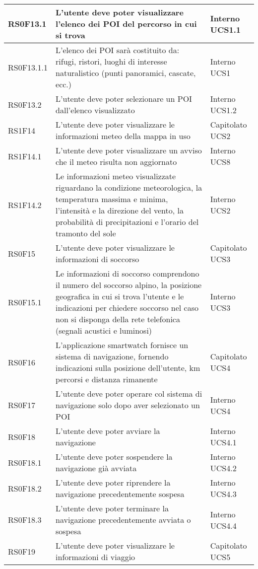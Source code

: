 \begin{center}
\begin{longtable}{|l|p{7cm}|p{1.7cm}|}
RS0F13.1	& L'utente deve poter visualizzare l'elenco dei POI del percorso in cui si trova & Interno UCS1.1 \\\hline
RS0F13.1.1	& L'elenco dei POI sarà costituito da: rifugi, ristori, luoghi di interesse naturalistico (punti panoramici, cascate, ecc.) & Interno UCS1 \\\hline
RS0F13.2	& L'utente deve poter selezionare un POI dall'elenco visualizzato & Interno UCS1.2 \\\hline
RS1F14		& L'utente deve poter visualizzare le informazioni meteo della mappa in uso & Capitolato UCS2 \\\hline
RS1F14.1	& L'utente deve poter visualizzare un avviso che il meteo risulta non aggiornato & Interno UCS8 \\\hline
RS1F14.2	& Le informazioni meteo visualizzate riguardano la condizione meteorologica, la temperatura massima e minima, l'intensità e la direzione del vento, la probabilità di precipitazioni e l'orario del tramonto del sole & Interno UCS2 \\\hline
RS0F15		& L'utente deve poter visualizzare le informazioni di soccorso & Capitolato UCS3 \\\hline
RS0F15.1	& Le informazioni di soccorso comprendono il numero del soccorso alpino, la posizione geografica in cui si trova l'utente e le indicazioni per chiedere soccorso nel caso non si disponga della rete telefonica (segnali acustici e luminosi) & Interno UCS3 \\\hline
RS0F16		& L'applicazione smartwatch fornisce un sistema di navigazione, fornendo indicazioni sulla posizione dell’utente, km percorsi e distanza rimanente & Capitolato UCS4 \\\hline
RS0F17		& L'utente deve poter operare col sistema di navigazione solo dopo aver selezionato un POI & Interno UCS4 \\\hline
RS0F18		& L'utente deve poter avviare la navigazione & Interno UCS4.1 \\\hline
RS0F18.1	& L'utente deve poter sospendere la navigazione già avviata & Interno UCS4.2 \\\hline
RS0F18.2	& L'utente deve poter riprendere la navigazione precedentemente sospesa & Interno UCS4.3 \\\hline
RS0F18.3	& L'utente deve poter terminare la navigazione precedentemente avviata o sospesa & Interno UCS4.4 \\\hline
RS0F19		& L'utente deve poter visualizzare le informazioni di viaggio & Capitolato UCS5 \\\hline

\end{longtable}
\end{center}
